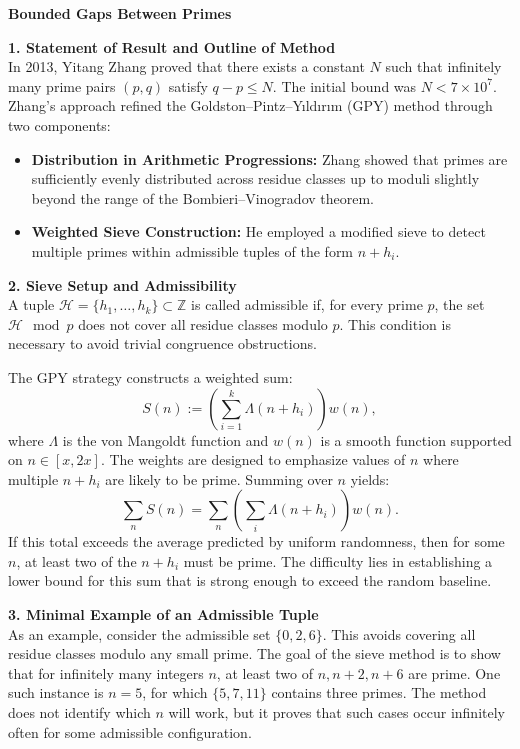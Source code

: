 \begin{technical}
{\Large\textbf{Bounded Gaps Between Primes}}

\textbf{1. Statement of Result and Outline of Method}\\[0.5em]
In 2013, Yitang Zhang proved that there exists a constant \( N \) such that infinitely many prime pairs \( (p, q) \) satisfy \( q - p \leq N \). The initial bound was \( N < 7\times10^7 \). Zhang's approach refined the Goldston–Pintz–Yıldırım (GPY) method through two components:

\begin{itemize}[leftmargin=*]
    \item \textbf{Distribution in Arithmetic Progressions:} Zhang showed that primes are sufficiently evenly distributed across residue classes up to moduli slightly beyond the range of the Bombieri–Vinogradov theorem.
    \item \textbf{Weighted Sieve Construction:} He employed a modified sieve to detect multiple primes within admissible tuples of the form \( n + h_i \).
\end{itemize}

\vspace{0.7em}
\textbf{2. Sieve Setup and Admissibility}\\[0.5em]
A tuple \( \mathcal{H} = \{h_1, \dots, h_k\} \subset \mathbb{Z} \) is called admissible if, for every prime \( p \), the set \( \mathcal{H} \mod p \) does not cover all residue classes modulo \( p \). This condition is necessary to avoid trivial congruence obstructions.

The GPY strategy constructs a weighted sum:
\[
S(n) := \left( \sum_{i=1}^k \Lambda(n + h_i) \right) w(n),
\]
where \( \Lambda \) is the von Mangoldt function and \( w(n) \) is a smooth function supported on \( n \in [x, 2x] \). The weights are designed to emphasize values of \( n \) where multiple \( n + h_i \) are likely to be prime. Summing over \( n \) yields:
\[
\sum_{n} S(n) = \sum_{n} \left( \sum_i \Lambda(n + h_i) \right) w(n).
\]
If this total exceeds the average predicted by uniform randomness, then for some \( n \), at least two of the \( n + h_i \) must be prime. The difficulty lies in establishing a lower bound for this sum that is strong enough to exceed the random baseline.

\vspace{0.7em}
\textbf{3. Minimal Example of an Admissible Tuple}\\[0.5em]
As an example, consider the admissible set \( \{0, 2, 6\} \). This avoids covering all residue classes modulo any small prime. The goal of the sieve method is to show that for infinitely many integers \( n \), at least two of \( n, n + 2, n + 6 \) are prime. One such instance is \( n = 5 \), for which \( \{5, 7, 11\} \) contains three primes. The method does not identify which \( n \) will work, but it proves that such cases occur infinitely often for some admissible configuration.


\end{technical}
